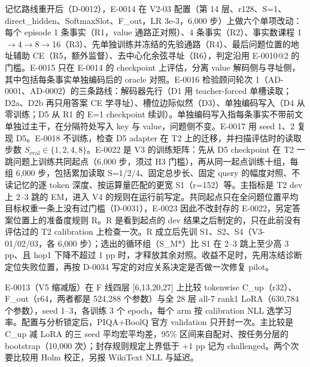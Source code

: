 \documentclass[11pt]{article}
\begin{document}
记忆路线重开后（D-0012），E-0014 在 V2-03 配置（第 14 层、r128、S=1、direct\_hidden、SoftmaxSlot、F\_out，LR 3e-3，6,000 步）上做六个单项改动：每个 episode 1 条事实（R1，value 通路正对照）、4 条事实（R2）、事实数课程 1$\rightarrow$4$\rightarrow$8$\rightarrow$16（R3）、先单独训练并冻结的先验通路（R4）、最后问题位置的地址辅助 CE（R5，额外监督）、去中心化余弦寻址（R6），判定沿用 E-0010@2 的门槛。E-0015 只在 E-0014 的 checkpoint 上评估，分离 value 解码侧与寻址侧，其中包括每条事实单独编码后的 oracle 对照。E-0016 检验顾问轮次 1（AD-0001、AD-0002）的三条路线：解码器先行（D1 用 teacher-forced 单槽读取；D2a、D2b 再只用答案 CE 学寻址）、槽位边际似然（D3）、单独编码写入（D4 从零训练；D5 从 R1 的 E=1 checkpoint 续训）。单独编码写入指每条事实不带前文单独过主干，在分隔符处写入 key 与 value，问题侧不变。E-0017 用 seed 1、2 复现 D5。E-0018 不训练，检查 D5 adapter 在 T2 上的迁移，并扫描评估时的读取步数 $S_\text{eval}\in\{1,2,4,8\}$。E-0022 是 V3 的训练矩阵：先从 D5 checkpoint 在 T2 一跳问题上训练共同起点（6,000 步，须过 H3 门槛），再从同一起点训练十组，每组 6,000 步，包括累加读取 S=1/2/4、固定总步长、固定 query 的幅度对照、不读记忆的逐 token 深度、按运算量匹配的更宽 S1（r=152）等。主指标是 T2 dev 上 2--3 跳的 EM，进入 V4 的规则在运行前写定。共同起点只在全问题位置平均目标权重一条上没有过门槛（D-0031），E-0023 因此不改封存的 E-0022，另定答案位置上的准备度规则 R。R 是看到起点的 dev 结果之后制定的，只在此前没有评估过的 T2 calibration 上检查一次。R 成立后先训 S1、S2、S4（V3-01/02/03，各 6,000 步）；选出的循环组（S\_M*）比 S1 在 2--3 跳上至少高 3 pp、且 hop1 下降不超过 1 pp 时，才释放其余对照。收益不足时，先用冻结诊断定位失败位置，再按 D-0034 写定的对应关系决定是否做一次修复 pilot。

E-0013（V5 缩减版）在 F 线四层 [6,13,20,27] 上比较 tokenwise C\_up（r32）、F\_out（r64，两者都是 524,288 个参数）与全 28 层 all-7 rank1 LoRA（630,784 个参数），seed 1--3，各训练 3 个 epoch，每个 arm 按 calibration NLL 选学习率。配置与分析锁定后，PIQA+BoolQ 官方 validation 只开封一次。主比较是 C\_up 减 LoRA 的三 seed 平均宏平均差，95\% 区间来自配对、按任务分层的 bootstrap（10,000 次）；封存规则规定上界低于 +1 pp 记为 challenged。两个次要比较用 Holm 校正，另报 WikiText NLL 与延迟。
\end{document}
